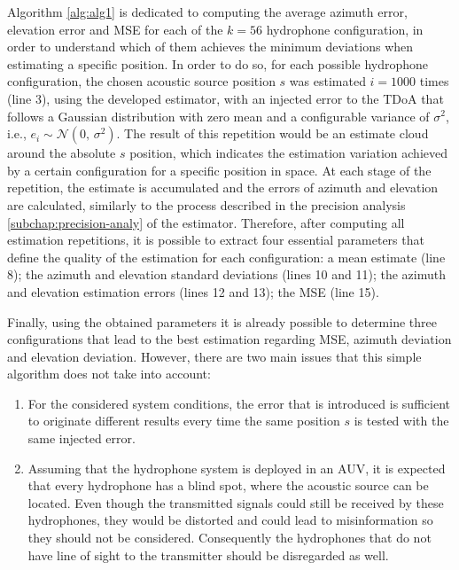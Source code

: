 Algorithm \ref{alg:alg1} is dedicated to computing the average azimuth error, elevation error and MSE for each of the $k = 56$ hydrophone configuration, in order to understand which of them achieves the minimum deviations when estimating a specific position. In order to do so, for each possible hydrophone configuration, the chosen acoustic source position $s$ was estimated $i = 1000$ times (line 3), using the developed estimator, with an injected error to the TDoA that follows a Gaussian distribution with zero mean and a configurable variance of $\sigma^{2}$, i.e., $e_i \sim \mathcal{N}(0,\,\sigma^{2})$. The result of this repetition would be an estimate cloud around the absolute $s$ position, which indicates the estimation variation achieved by a certain configuration for a specific position in space. At each stage of the repetition, the estimate is accumulated and the errors of azimuth and elevation are calculated, similarly  to the process described in the precision analysis \ref{subchap:precision-analy} of the estimator. Therefore, after computing all estimation repetitions, it is possible to extract four essential parameters that define the quality of the estimation for each configuration: a mean estimate (line 8); the azimuth and elevation standard deviations (lines 10 and 11); the azimuth and elevation estimation errors (lines 12 and 13); the MSE (line 15).

Finally, using the obtained parameters it is already possible to determine three configurations that lead to the best estimation regarding MSE, azimuth deviation and elevation deviation. However, there are two main issues that this simple algorithm does not take into account:

\begin{enumerate}
	
	\item  For the considered system conditions, the error that is introduced is sufficient to originate different results every time the same position $s$ is tested with the same injected error.
	
	\item Assuming that the hydrophone system is deployed in an AUV, it is expected that every hydrophone has a blind spot, where the acoustic source can be located. Even though the transmitted signals could still be received by these hydrophones, they would be distorted and could lead to misinformation so they should not be considered. Consequently the hydrophones that do not have line of sight to the transmitter should be disregarded as well. 
	
\end{enumerate}

